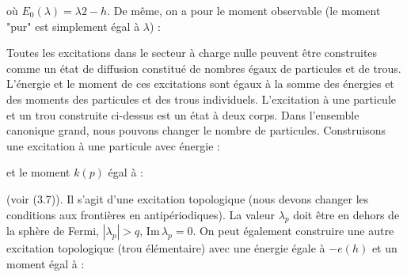 où \( E_0(\lambda) = \lambda2 - h \). De même, on a pour le moment observable (le moment "pur" est simplement égal à $\lambda$) :

Toutes les excitations dans le secteur à charge nulle peuvent être construites comme un état de diffusion constitué de nombres égaux de particules et de trous. L'énergie et le moment de ces excitations sont égaux à la somme des énergies et des moments des particules et des trous individuels. L'excitation à une particule et un trou construite ci-dessus est un état à deux corps. Dans l'ensemble canonique grand, nous pouvons changer le nombre de particules. Construisons une excitation à une particule avec énergie :

et le moment \( k(p) \) égal à :

(voir (3.7)). Il s'agit d'une excitation topologique (nous devons changer les conditions aux frontières en antipériodiques). La valeur \( \lambda_p \) doit être en dehors de la sphère de Fermi, \( |\lambda_p| > q \), \( \text{Im} \, \lambda_p = 0 \). On peut également construire une autre excitation topologique (trou élémentaire) avec une énergie égale à \( -e(h) \) et un moment égal à :



